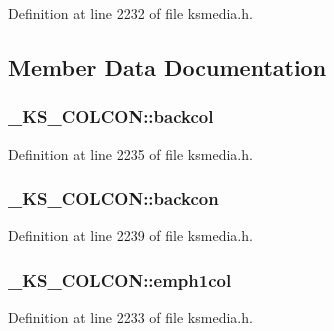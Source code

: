 Definition at line 2232 of file ksmedia.\+h.



\subsection{Member Data Documentation}
\subsubsection[{\texorpdfstring{backcol}{backcol}}]{ \+\_\+\+K\+S\+\_\+\+C\+O\+L\+C\+O\+N\+::backcol}\hypertarget{struct___k_s___c_o_l_c_o_n_a684204cb71734c5d94401f0d223a6846}{}\label{struct___k_s___c_o_l_c_o_n_a684204cb71734c5d94401f0d223a6846}


Definition at line 2235 of file ksmedia.\+h.

\subsubsection[{\texorpdfstring{backcon}{backcon}}]{ \+\_\+\+K\+S\+\_\+\+C\+O\+L\+C\+O\+N\+::backcon}\hypertarget{struct___k_s___c_o_l_c_o_n_af0dcdae6fd02ec0d9c9fd3a51cae6b94}{}\label{struct___k_s___c_o_l_c_o_n_af0dcdae6fd02ec0d9c9fd3a51cae6b94}


Definition at line 2239 of file ksmedia.\+h.

\subsubsection[{\texorpdfstring{emph1col}{emph1col}}]{ \+\_\+\+K\+S\+\_\+\+C\+O\+L\+C\+O\+N\+::emph1col}\hypertarget{struct___k_s___c_o_l_c_o_n_a216b8b7bae51b64cb4b332bc2a83df32}{}\label{struct___k_s___c_o_l_c_o_n_a216b8b7bae51b64cb4b332bc2a83df32}


Definition at line 2233 of file ksmedia.\+h.

